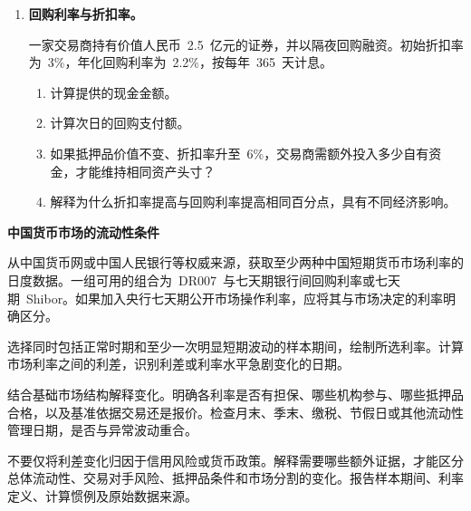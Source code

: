 \begin{enumerate}
\begin{enumerate}
\item 给出利差可能扩大的两个经济原因。

\end{enumerate}

\item \textbf{回购利率与折扣率。}

一家交易商持有价值人民币~2.5~亿元的证券，并以隔夜回购融资。初始折扣率为~3\%，年化回购利率为~2.2\%，按每年~365~天计息。

\begin{enumerate}

\item 计算提供的现金金额。

\item 计算次日的回购支付额。

\item 如果抵押品价值不变、折扣率升至~6\%，交易商需额外投入多少自有资金，才能维持相同资产头寸？

\item 解释为什么折扣率提高与回购利率提高相同百分点，具有不同经济影响。

\end{enumerate}

\end{enumerate}



\textbf{中国货币市场的流动性条件}

从中国货币网或中国人民银行等权威来源，获取至少两种中国短期货币市场利率的日度数据。一组可用的组合为~DR007~与七天期银行间回购利率或七天期~Shibor。如果加入央行七天期公开市场操作利率，应将其与市场决定的利率明确区分。

选择同时包括正常时期和至少一次明显短期波动的样本期间，绘制所选利率。计算市场利率之间的利差，识别利差或利率水平急剧变化的日期。

结合基础市场结构解释变化。明确各利率是否有担保、哪些机构参与、哪些抵押品合格，以及基准依据交易还是报价。检查月末、季末、缴税、节假日或其他流动性管理日期，是否与异常波动重合。

不要仅将利差变化归因于信用风险或货币政策。解释需要哪些额外证据，才能区分总体流动性、交易对手风险、抵押品条件和市场分割的变化。报告样本期间、利率定义、计算惯例及原始数据来源。


